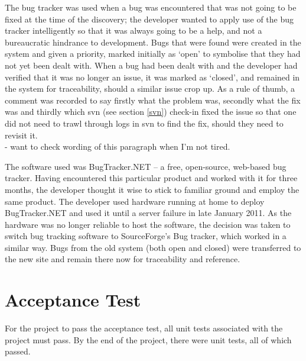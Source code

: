 The bug tracker was used when a bug was encountered that was not going to be fixed at the time of the discovery; the developer wanted to apply use of the bug tracker intelligently so that it was always going to be a help, and not a bureaucratic hindrance to development.  Bugs that were found were created in the system and given a priority, marked initially as `open' to symbolise that they had not yet been dealt with.  When a bug had been dealt with and the developer had verified that it was no longer an issue, it was marked as `closed', and remained in the system for traceability, should a similar issue crop up.  As a rule of thumb, a comment was recorded to say firstly what the problem was, secondly what the fix was and thirdly which \gls{svn} (see section \ref{svn}) check-in fixed the issue so that one did not need to trawl through logs in \gls{svn} to find the fix, should they need to revisit it.\\ \revisit - want to check wording of this paragraph when I'm not tired.

The software used was BugTracker.NET -- a free, open-source, web-based bug tracker.  Having encountered this particular product and worked with it for three months, the developer thought it wise to stick to familiar ground and employ the same product.  The developer used hardware running at home to deploy BugTracker.NET and used it until a server failure in late January 2011.  As the hardware was no longer reliable to host the software, the decision was taken to switch bug tracking software to SourceForge's Bug tracker, which worked in a similar way.  Bugs from the old system (both open and closed) were transferred to the new site and remain there now for traceability and reference.

\section{Acceptance Test}
For the project to pass the acceptance test, all unit tests associated with the project must pass.  By the end of the project, there were \revisit unit tests, all of which passed.
